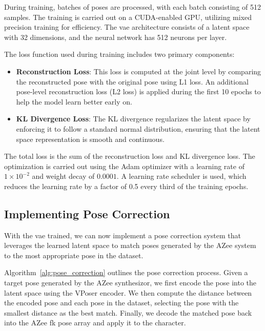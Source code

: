 \documentclass[../../main.tex]{subfiles}
\begin{document}
During training, batches of poses are processed, with each batch consisting of 512 samples. The training is carried out on a CUDA-enabled GPU, utilizing mixed precision training for efficiency. The \gls{vae} architecture consists of a latent space with 32 dimensions, and the neural network has 512 neurons per layer. 

The loss function used during training includes two primary components: 
\begin{itemize}
    \item \textbf{Reconstruction Loss}: This loss is computed at the joint level by comparing the reconstructed pose with the original pose using L1 loss. An additional pose-level reconstruction loss (L2 loss) is applied during the first 10 epochs to help the model learn better early on.
    \item \textbf{KL Divergence Loss}: The KL divergence regularizes the latent space by enforcing it to follow a standard normal distribution, ensuring that the latent space representation is smooth and continuous.
\end{itemize}

The total loss is the sum of the reconstruction loss and KL divergence loss. The optimization is carried out using the Adam optimizer with a learning rate of $1 \times 10^{-2}$ and weight decay of $0.0001$. A learning rate scheduler is used, which reduces the learning rate by a factor of 0.5 every third of the training epochs. 

\subsection{Implementing Pose Correction}
\label{ch:intermediate_blocks_pose_correction:pose_correction_with_azee:implementation}

With the \gls{vae} trained, we can now implement a pose correction system that leverages the learned latent space to match poses generated by the AZee system to the most appropriate pose in the dataset.

Algorithm~\ref{alg:pose_correction} outlines the pose correction process. Given a target pose generated by the AZee synthesizor, we first encode the pose into the latent space using the VPoser encoder. We then compute the distance between the encoded pose and each pose in the dataset, selecting the pose with the smallest distance as the best match. Finally, we decode the matched pose back into the AZee \gls{fk} pose array and apply it to the character.
\end{document}
